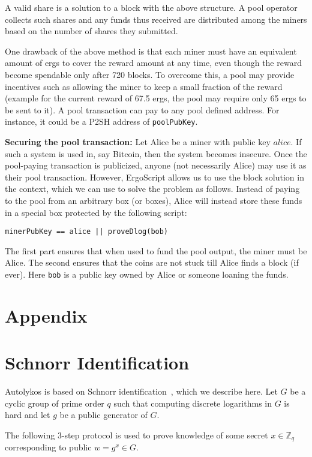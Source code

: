 \documentclass[runningheads]{llncs}
\newcommand{\langname}{ErgoScript\xspace}
\newcommand{\powname}{Autolykos\xspace}
\begin{document}
A valid share is a solution to a block with the above structure. A pool operator collects such shares and any funds thus received are distributed among the miners based on the number of shares they submitted.

One drawback of the above method is that each miner must have an equivalent amount of ergs to cover the reward amount at any time, even though the reward become spendable only after 720 blocks. To overcome this, a pool may provide incentives such as allowing the miner to keep a small fraction of the reward (example for the current reward of 67.5 ergs, the pool may require only 65 ergs to be sent to it). A pool transaction can pay to any pool defined address. For instance, it could be a P2SH address of \texttt{poolPubKey}. 

\textbf{Securing the pool transaction:} Let Alice be a miner with public key $alice$. If such a system is used in, say Bitcoin, then the system becomes insecure. Once the pool-paying transaction is publicized, anyone (not necessarily Alice) may use it as their pool transaction. 
However, \langname allows us to use the block solution in the context, which we can use to solve the problem as follows. Instead of paying to the pool from an arbitrary box (or boxes), Alice will instead store these funds in a special box protected by the following script:
\begin{verbatim}
minerPubKey == alice || proveDlog(bob)
\end{verbatim}
The first part ensures that when used to fund the pool output, the miner must be Alice. The second ensures that the coins are not stuck till Alice finds a block (if ever). Here \texttt{bob} is a public key owned by Alice or someone loaning the funds.
 


\appendix
\section*{Appendix}
\section{Schnorr Identification}
\label{schnorr}
\powname is based on Schnorr identification~\cite{schnorr}, which we describe here. Let $G$ be a cyclic group of prime order $q$ such that computing discrete logarithms in $G$ is hard and let $g$ be a public generator of $G$. 

The following 3-step protocol is used to prove knowledge of some secret $x\in\mathbb{Z}_q$ corresponding to public $w = g^x\in G$. 
\end{document}
